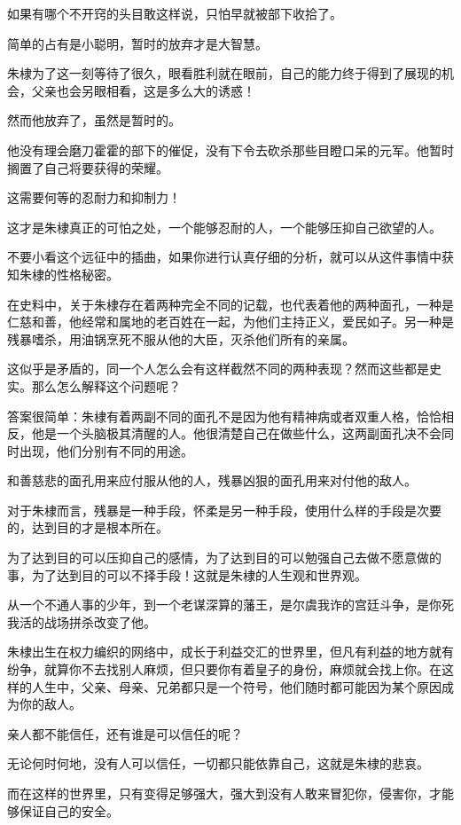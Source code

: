 \begin{multicols}{\theparacolNo}
		如果有哪个不开窍的头目敢这样说，只怕早就被部下收拾了。

		简单的占有是小聪明，暂时的放弃才是大智慧。

		朱棣为了这一刻等待了很久，眼看胜利就在眼前，自己的能力终于得到了展现的机会，父亲也会另眼相看，这是多么大的诱惑！

		然而他放弃了，虽然是暂时的。

		他没有理会磨刀霍霍的部下的催促，没有下令去砍杀那些目瞪口呆的元军。他暂时搁置了自己将要获得的荣耀。

		这需要何等的忍耐力和抑制力！

		这才是朱棣真正的可怕之处，一个能够忍耐的人，一个能够压抑自己欲望的人。

		不要小看这个远征中的插曲，如果你进行认真仔细的分析，就可以从这件事情中获知朱棣的性格秘密。

		在史料中，关于朱棣存在着两种完全不同的记载，也代表着他的两种面孔，一种是仁慈和善，他经常和属地的老百姓在一起，为他们主持正义，爱民如子。另一种是残暴嗜杀，用油锅烹死不服从他的大臣，灭杀他们所有的亲属。

		这似乎是矛盾的，同一个人怎么会有这样截然不同的两种表现？然而这些都是史实。那么怎么解释这个问题呢？

		答案很简单：朱棣有着两副不同的面孔不是因为他有精神病或者双重人格，恰恰相反，他是一个头脑极其清醒的人。他很清楚自己在做些什么，这两副面孔决不会同时出现，他们分别有不同的用途。

		和善慈悲的面孔用来应付服从他的人，残暴凶狠的面孔用来对付他的敌人。

		对于朱棣而言，残暴是一种手段，怀柔是另一种手段，使用什么样的手段是次要的，达到目的才是根本所在。

		为了达到目的可以压抑自己的感情，为了达到目的可以勉强自己去做不愿意做的事，为了达到目的可以不择手段！这就是朱棣的人生观和世界观。

		从一个不通人事的少年，到一个老谋深算的藩王，是尔虞我诈的宫廷斗争，是你死我活的战场拼杀改变了他。

		朱棣出生在权力编织的网络中，成长于利益交汇的世界里，但凡有利益的地方就有纷争，就算你不去找别人麻烦，但只要你有着皇子的身份，麻烦就会找上你。在这样的人生中，父亲、母亲、兄弟都只是一个符号，他们随时都可能因为某个原因成为你的敌人。

		亲人都不能信任，还有谁是可以信任的呢？

		无论何时何地，没有人可以信任，一切都只能依靠自己，这就是朱棣的悲哀。

		而在这样的世界里，只有变得足够强大，强大到没有人敢来冒犯你，侵害你，才能够保证自己的安全。


\end{multicols}
